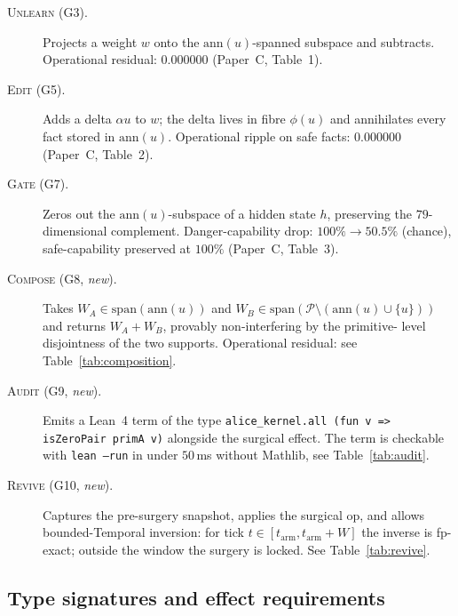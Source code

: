 \documentclass{article}
\begin{document}
\begin{description}
\item[\textsc{Unlearn} (G3).] Projects a weight $w$ onto the
      $\mathrm{ann}(u)$-spanned subspace and subtracts.  Operational
      residual: $0.000000$ (Paper~C, Table~1).
\item[\textsc{Edit} (G5).] Adds a delta $\alpha u$ to $w$; the delta
      lives in fibre $\phi(u)$ and annihilates every fact stored in
      $\mathrm{ann}(u)$.  Operational ripple on safe facts: $0.000000$
      (Paper~C, Table~2).
\item[\textsc{Gate} (G7).] Zeros out the $\mathrm{ann}(u)$-subspace of
      a hidden state $h$, preserving the $79$-dimensional complement.
      Danger-capability drop: $100\% \to 50.5\%$ (chance), safe-capability
      preserved at $100\%$ (Paper~C, Table~3).
\item[\textsc{Compose} (G8, \emph{new}).] Takes $W_A \in
      \mathrm{span}(\mathrm{ann}(u))$ and $W_B \in
      \mathrm{span}(\mathcal{P} \setminus (\mathrm{ann}(u) \cup \{u\}))$
      and returns $W_A + W_B$, provably non-interfering by the primitive-
      level disjointness of the two supports.  Operational residual: see
      Table~\ref{tab:composition}.
\item[\textsc{Audit} (G9, \emph{new}).] Emits a Lean~4 term of the type
      \texttt{alice\_kernel.all (fun v => isZeroPair primA v)} alongside
      the surgical effect.  The term is checkable with \texttt{lean --run}
      in under $50\,$ms without Mathlib, see Table~\ref{tab:audit}.
\item[\textsc{Revive} (G10, \emph{new}).] Captures the pre-surgery
      snapshot, applies the surgical op, and allows bounded-Temporal
      inversion: for tick $t \in [t_{\mathrm{arm}}, t_{\mathrm{arm}}+W]$
      the inverse is fp-exact; outside the window the surgery is locked.
      See Table~\ref{tab:revive}.
\end{description}

\subsection{Type signatures and effect requirements}
\end{document}
